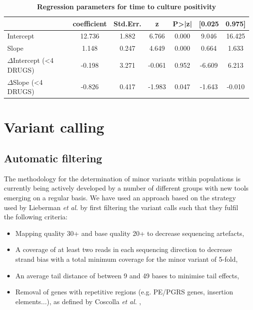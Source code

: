 \documentclass[12pt, oneside]{article}   	%
\begin{document}
\begin{table}[htbp]
   \centering
   \caption*{\textbf{Regression parameters for time to culture positivity}}
   \begin{tabular}{@{} lcccccc @{}} %
      \toprule
       & coefficient & Std.Err. & z & P>|z| & [0.025 & 0.975]\\
      \midrule
      Intercept & 12.736 & 1.882 & 6.766 & 0.000 & 9.046 & 16.425\\
      Slope & 1.148 & 0.247 & 4.649 & 0.000 & 0.664 & 1.633\\
      $\Delta$Intercept (<4 DRUGS) & -0.198 & 3.271 & -0.061 & 0.952 & -6.609 & 6.213\\
      $\Delta$Slope (<4 DRUGS) & -0.826 & 0.417 & -1.983 & 0.047 & -1.643 & -0.010\\
      \bottomrule
   \end{tabular}
   \label{tab:LRCoeff}
\end{table}



\section{Variant calling}
\subsection{Automatic filtering}
The methodology for the determination of minor variants within populations is currently being actively developed by a number of different groups with new tools emerging on a regular basis. We have used an approach based on the strategy used by Lieberman \textsl{et al.} \cite{Lieberman2014} by first filtering the variant calls such that they fulfil the following criteria:

\begin{itemize}
  \item Mapping quality 30+ and base quality 20+ to decrease sequencing artefacts,
  \item A coverage of at least two reads in each sequencing direction to decrease strand bias with a total minimum coverage for the minor variant of 5-fold,
  \item An average tail distance of between 9 and 49 bases to minimise tail effects,
  \item Removal of genes with repetitive regions (e.g. PE/PGRS genes, insertion elements...), as defined by Coscolla \textsl{et al.} \cite{Coscolla2015},
\end{itemize}
\end{document}
